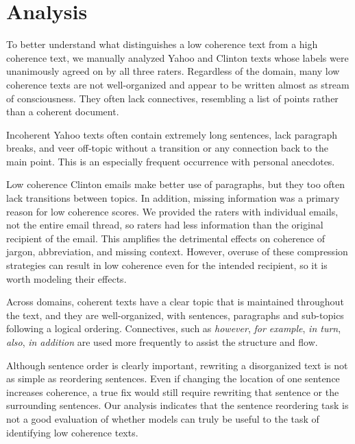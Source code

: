 \documentclass[11pt,a4paper]{article}
\begin{document}
\section{Analysis}
\label{sec:analysis}

To better understand what distinguishes a low coherence text from a high coherence text, we manually analyzed Yahoo and Clinton texts whose labels were unanimously agreed on by all three raters.
Regardless of the domain, many low coherence texts are not well-organized and appear to be written almost as stream of consciousness. They often lack connectives, resembling a list of points rather than a coherent document.

Incoherent Yahoo texts often contain extremely long sentences, lack paragraph breaks, and veer off-topic without a transition or any connection back to the main point. This is an especially frequent occurrence with personal anecdotes.

Low coherence Clinton emails make better use of paragraphs, but they too often lack transitions between topics. In addition, missing information was a primary reason for low coherence scores. We provided the raters with individual emails, not the entire email thread, so raters had less information than the original recipient of the email. This amplifies the detrimental effects on coherence of jargon, abbreviation, and missing context. However, overuse of these compression strategies can result in low coherence even for the intended recipient, so it is worth modeling their effects.


Across domains, coherent texts have a clear topic that is maintained throughout the text, and they are well-organized, with sentences, paragraphs and sub-topics following a logical ordering. 
Connectives, such as \textit{however}, \textit{for example}, \textit{in turn}, \textit{also}, \textit{in addition} are used more frequently to assist the structure and flow.  

Although sentence order is clearly important, rewriting a disorganized text is not as simple as reordering sentences. Even if changing the location of one sentence increases coherence, a true fix would still require rewriting that sentence or the surrounding sentences. Our analysis indicates that the sentence reordering task is not a good evaluation of whether models can truly be useful to the task of identifying low coherence texts.
\end{document}
